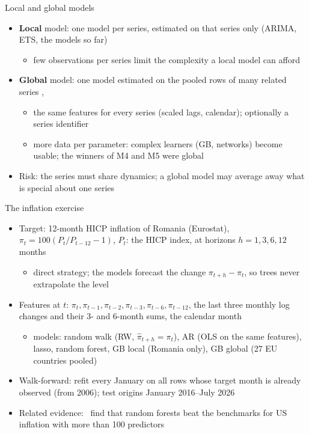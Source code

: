 \begin{frame}{Local and global models}
\itemsize{\small}
\begin{itemize}
    \item \textbf{Local} model: one model per series, estimated on that series only (ARIMA, ETS, the models so far)
    \begin{itemize}
        \item few observations per series limit the complexity a local model can afford
    \end{itemize}
    \item \textbf{Global} model: one model estimated on the pooled rows of many related series , 
    \begin{itemize}
        \item the same features for every series (scaled lags, calendar); optionally a series identifier
        \item more data per parameter: complex learners (GB, networks) become usable; the winners of M4 and M5 were global
    \end{itemize}
    \item Risk: the series must share dynamics; a global model may average away what is special about one series
\end{itemize}
\end{frame}

\begin{frame}{The inflation exercise}
\itemsize{\footnotesize}
\begin{itemize}
    \item Target: 12-month HICP inflation of Romania (Eurostat), $\pi_t = 100(P_t/P_{t-12} - 1)$, $P_t$: the HICP index, at horizons $h = 1, 3, 6, 12$ months
    \begin{itemize}
        \item direct strategy; the models forecast the change $\pi_{t+h} - \pi_t$, so trees never extrapolate the level
    \end{itemize}
    \item Features at $t$: $\pi_t, \pi_{t-1}, \pi_{t-2}, \pi_{t-3}, \pi_{t-6}, \pi_{t-12}$, the last three monthly log changes and their 3- and 6-month sums, the calendar month
    \begin{itemize}
        \item models: random walk (RW, $\hat\pi_{t+h} = \pi_t$), AR (OLS on the same features), lasso, random forest, GB local (Romania only), GB global (27 EU countries pooled)
    \end{itemize}
    \item Walk-forward: refit every January on all rows whose target month is already observed (from 2006); test origins January 2016--July 2026
    \item Related evidence: \ find that random forests beat the benchmarks for US inflation with more than 100 predictors
\end{itemize}
\end{frame}

